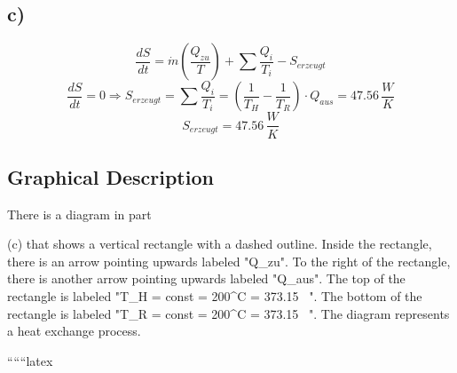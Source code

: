 

\subsection*{c)}
\[
\frac{dS}{dt} = \dot{m} \left( \frac{Q_{zu}}{T} \right) + \sum \frac{Q_i}{T_i} - S_{erzeugt}
\]
\[
\frac{dS}{dt} = 0 \Rightarrow S_{erzeugt} = \sum \frac{Q_i}{T_i} = \left( \frac{1}{T_H} - \frac{1}{T_R} \right) \cdot Q_{aus} = 47.56 \, \frac{W}{K}
\]
\[
S_{erzeugt} = 47.56 \, \frac{W}{K}
\]

\subsection*{Graphical Description}
There is a diagram in part

(c) that shows a vertical rectangle with a dashed outline. Inside the rectangle, there is an arrow pointing upwards labeled "Q_{zu}". To the right of the rectangle, there is another arrow pointing upwards labeled "Q_{aus}". The top of the rectangle is labeled "T_H = const = 200^\circ C = 373.15 \, ". The bottom of the rectangle is labeled "T_R = const = 200^\circ C = 373.15 \, ". The diagram represents a heat exchange process.

``````latex